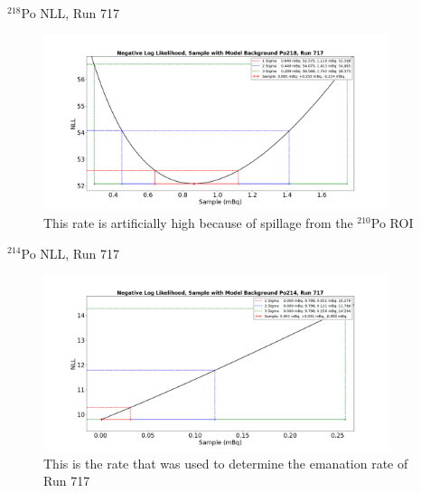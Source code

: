 \documentclass[aspectratio=169]{beamer}
\begin{document}
\begin{frame}{$^{218}$Po NLL, Run 717}
    \begin{figure}
        \begin{center}
            \includegraphics[width=0.9\textwidth]
            {assets/717/NLL218.png}
            \caption{This rate is artificially high because of spillage from the $^{210}$Po ROI}
        \end{center}
    \end{figure}
\end{frame}

\begin{frame}{$^{214}$Po NLL, Run 717}
    \begin{figure}
        \begin{center}
            \includegraphics[width=0.9\textwidth]
            {assets/717/NLL214.png}
            \caption{This is the rate that was used to determine the emanation rate of Run 717}
        \end{center}
    \end{figure}
\end{frame}
\end{document}
